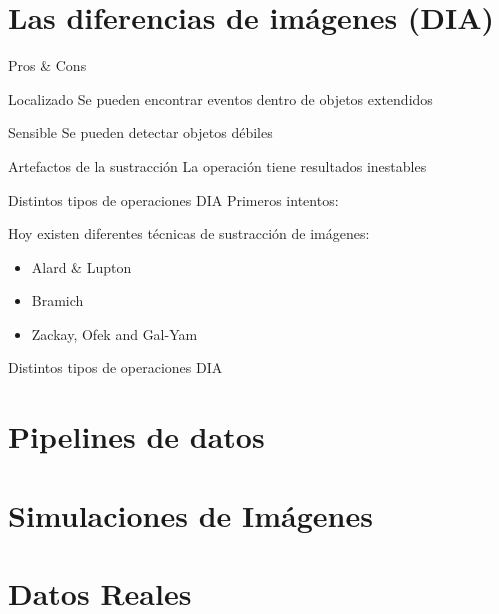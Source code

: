 \documentclass[14pt]{beamer}
\begin{document}
\section{Las diferencias de im\'agenes (DIA)}
\begin{frame}{Pros \& Cons}
   \begin{exampleblock}{Localizado}
   Se pueden encontrar eventos dentro de objetos extendidos
   \end{exampleblock}
   \pause
   \begin{exampleblock}{Sensible}
   Se pueden detectar objetos d\'ebiles
   \end{exampleblock}
   \pause
   \begin{alertblock}{Artefactos de la sustracci\'on}
   La operaci\'on tiene resultados inestables
   \end{alertblock}
   
\end{frame}

\begin{frame}{Distintos tipos de operaciones DIA}
    Primeros intentos: \cite{phillips_registering_1995}
    
    Hoy existen diferentes t\'ecnicas de sustracci\'on de im\'agenes:
    \begin{itemize}
        \item Alard \& Lupton \cite{alard_method_1998}
        \item Bramich \cite{bramich_new_2008}
        \item Zackay, Ofek and Gal-Yam \cite{zackay_proper_2016}
    \end{itemize}
\end{frame}

\begin{frame}{Distintos tipos de operaciones DIA}
    
\end{frame}

\section{Pipelines de datos}
\section{Simulaciones de Im\'agenes}
\section{Datos Reales}
\end{document}
